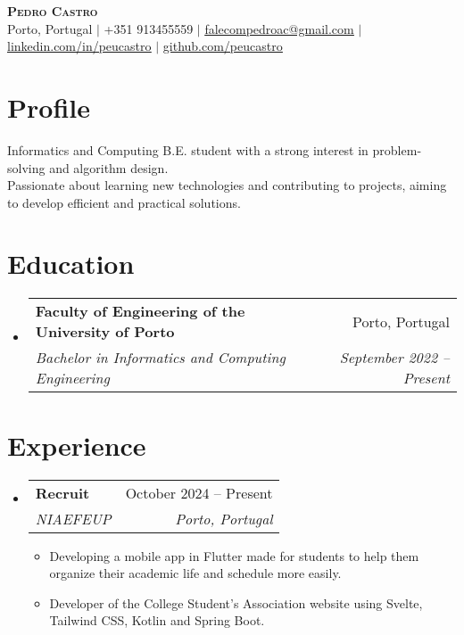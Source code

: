 \documentclass[a4paper,11pt]{article}
\makeatletter
\newcommand{\resumeItem}[1]{
	\item\small{
		{#1 \vspace{-2pt}}
	}
}
\newcommand{\resumeSubheading}[4]{
	\vspace{-2pt}\item
	\begin{tabular*}{0.97\textwidth}[t]{l@{\extracolsep{\fill}}r}
		\textbf{#1} & #2 \\
		\textit{\small#3} & \textit{\small #4} \\
	\end{tabular*}\vspace{-7pt}
}
\newcommand{\resumeSubHeadingListStart}{\begin{itemize}[leftmargin=0.15in, label={}]}
\newcommand{\resumeSubHeadingListEnd}{\end{itemize}}
\newcommand{\resumeItemListStart}{\begin{itemize}}
\newcommand{\resumeItemListEnd}{\end{itemize}\vspace{-5pt}}
\makeatother
\begin{document}
\begin{center}
	\textbf{\Huge \scshape Pedro Castro} \\ \vspace{1pt}
	\small Porto, Portugal $|$ +351 913455559 $|$ \href{mailto:falecompedroac@gmail.com}{\underline{falecompedroac@gmail.com}} $|$
	\href{https://linkedin.com/in/peucastro}{\underline{linkedin.com/in/peucastro}} $|$
	\href{https://github.com/peucastro}{\underline{github.com/peucastro}}
\end{center}

\section{Profile}
\begin{itemize}[leftmargin=0.15in, label={}]
	\small{\item{
	      Informatics and Computing B.E. student with a strong interest in problem-solving and algorithm design. \\
	      Passionate about learning new technologies and contributing to projects, aiming to develop efficient and practical solutions.
	      }}
\end{itemize}

\section{Education}
\resumeSubHeadingListStart%

\resumeSubheading%
{Faculty of Engineering of the University of Porto}{Porto, Portugal}
{Bachelor in Informatics and Computing Engineering}{September 2022 – Present}

\resumeSubHeadingListEnd%

\section{Experience}
\resumeSubHeadingListStart%

\resumeSubheading%
{Recruit}{October 2024 – Present}
{NIAEFEUP}{Porto, Portugal}
\resumeItemListStart%
\resumeItem{Developing a mobile app in Flutter made for students to help them organize their academic life and schedule more easily.}
\resumeItem{Developer of the College Student's Association website using Svelte, Tailwind CSS, Kotlin and Spring Boot.}
\resumeItemListEnd%

\resumeSubHeadingListEnd%
\end{document}
